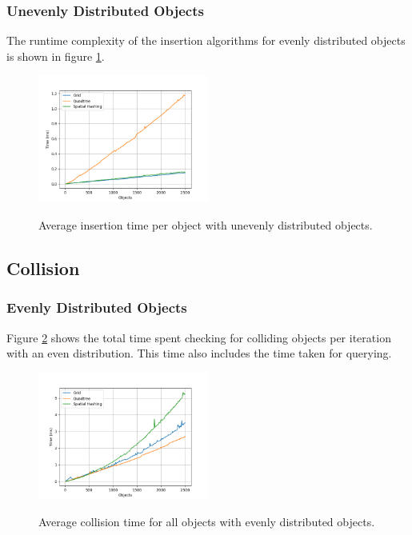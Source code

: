 \documentclass[a4paper, 12pt]{article}
\begin{document}
\subsubsection{Unevenly Distributed Objects}
The runtime complexity of the insertion algorithms for evenly distributed
objects is shown in figure \ref{fig:uneven-insert}.
\begin{figure}[h]
    \centering
    \caption{Average insertion time per object with unevenly distributed
    objects.}
    \includegraphics[width=0.5\textwidth]{uneven-insert.png}
    \label{fig:uneven-insert}
\end{figure}

\subsection{Collision}

\subsubsection{Evenly Distributed Objects}
Figure \ref{fig:even-collision} shows the total time spent checking for
colliding objects per iteration with an even distribution. This time also
includes the time taken for querying.
\begin{figure}[h]
    \centering
    \caption{Average collision time for all objects with evenly distributed
    objects.}
    \includegraphics[width=0.5\textwidth]{even-collision.png}
    \label{fig:even-collision}
\end{figure}
\end{document}
